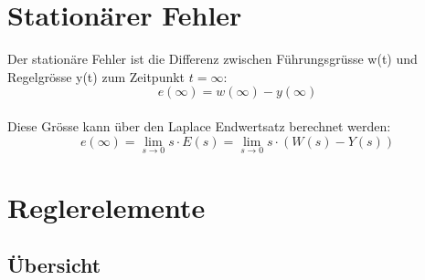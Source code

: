 \section{Stationärer Fehler}
Der stationäre Fehler ist die Differenz zwischen Führungsgrüsse w(t) und Regelgrösse y(t) zum Zeitpunkt $t = \infty$:
\[
	e(\infty) = w(\infty) - y(\infty)
\]
~\\
Diese Grösse kann über den Laplace Endwertsatz berechnet werden:
\[
	 e(\infty) = \lim\limits_{s \rightarrow 0} s \cdot E(s) =  \lim\limits_{s \rightarrow 0} s \cdot \left(W(s) - Y(s)\right)
\]

\newpage

\section{Reglerelemente}
\subsection{Übersicht}
